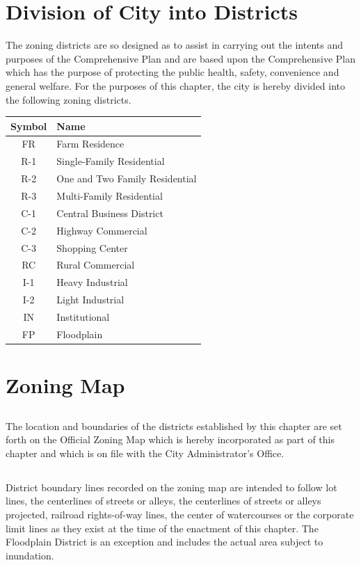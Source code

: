 \section{Division of City into Districts}
The zoning districts are so designed as to assist in carrying out the intents and purposes of the Comprehensive Plan and are based upon the Comprehensive Plan which has the purpose of protecting the public health, safety, convenience and general welfare. For the purposes of this chapter, the city is hereby divided into the following zoning districts.
\begin{center}
    \begin{tabular}{|c|p{5cm}|}
    \hline
    \textbf{Symbol} & \textbf{Name}\\
    \hline
    FR & Farm Residence\\
    \hline
   R-1 & Single-Family Residential\\
    \hline
   R-2 & One and Two Family Residential\\
    \hline
   R-3 & Multi-Family Residential\\
    \hline
   C-1 & Central Business District\\
    \hline
   C-2 & Highway Commercial\\
    \hline
   C-3 & Shopping Center\\
    \hline
    RC & Rural Commercial\\
    \hline
   I-1 & Heavy Industrial\\
    \hline
   I-2 & Light Industrial\\
    \hline
    IN & Institutional\\
    \hline
    FP & Floodplain\\
    \hline
\end{tabular}
\end{center}

\section{Zoning Map}
\subsection{}
The location and boundaries of the districts established by this chapter are set forth on the Official Zoning Map which is hereby incorporated as part of this chapter and which is on file with the City Administrator’s Office.
\subsection{}
District boundary lines recorded on the zoning map are intended to follow lot lines, the centerlines of streets or alleys, the centerlines of streets or alleys projected, railroad rights-of-way lines, the center of watercourses or the corporate limit lines as they exist at the time of the enactment of this chapter.  The Floodplain District is an exception and includes the actual area subject to inundation.
